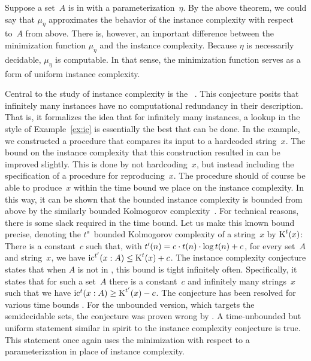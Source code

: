Suppose a set~$A$ is in  with a parameterization~$\eta$.
By the above theorem, we could say that $\mu_\eta$ approximates the behavior of the instance complexity with respect to~$A$ from above.
There is, however, an important difference between the minimization function $\mu_\eta$ and the instance complexity.
Because $\eta$ is necessarily decidable, $\mu_\eta$ is computable.
In that sense, the minimization function serves as a form of uniform instance complexity.

Central to the study of instance complexity is the ~\parencite{orponen1994instance}.
This conjecture posits that infinitely many instances have no computational redundancy in their description.
That is, it formalizes the idea that for infinitely many instances, a lookup in the style of Example~\ref{ex:ic} is essentially the best that can be done.
In the example, we constructed a procedure that compares its input to a hardcoded string~$x$.
The bound on the instance complexity that this construction resulted in can be improved slightly.
This is done by not hardcoding~$x$, but instead including the specification of a procedure for reproducing~$x$.
The procedure should of course be able to produce~$x$ within the time bound we place on the instance complexity.
In this way, it can be shown that the bounded instance complexity is bounded from above by the similarly bounded Kolmogorov complexity~\parencite{orponen1994instance,li2008introduction}.
For technical reasons, there is some slack required in the time bound.
Let us make this known bound precise, denoting the $t$"~bounded Kolmogorov complexity of a string~$x$ by $\operatorname{K}^t(x)$:
There is a constant~$c$ such that, with $t'(n) = c \cdot t(n) \cdot \log t(n) + c$, for every set~$A$ and string~$x$, we have $\operatorname{ic}^{t'}(x : A) \le \operatorname{K}^t(x) + c$.
The instance complexity conjecture states that when $A$ is not in , this bound is tight infinitely often.
Specifically, it states that for such a set~$A$ there is a constant~$c$ and infinitely many strings~$x$ such that we have $\operatorname{ic}^t(x : A) \ge \operatorname{K}^{t'}(x) - c$.
The conjecture has been resolved for various time bounds \parencite{fortnow1996resource,buhrman1996random}.
For the unbounded version, which targets the semidecidable sets, the conjecture was proven wrong by \textcite{kummer1996kolmogorov}.
A time-unbounded but uniform statement similar in spirit to the instance complexity conjecture is true.
This statement once again uses the minimization with respect to a parameterization in place of instance complexity.

